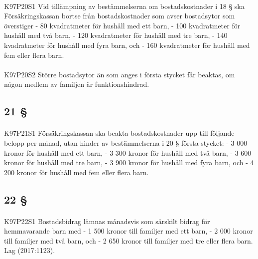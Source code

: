 \documentclass[a4paper,notitlepage,openany,10pt]{book}
\begin{document}
\paragraph*{}
{\tiny K97P20S1}
Vid tillämpning av bestämmelserna om bostadskostnader i 18 § ska Försäkringskassan bortse från bostadskostnader som avser bostadsytor som överstiger - 80 kvadratmeter för hushåll med ett barn,
\newline - 100 kvadratmeter för hushåll med två barn,
\newline - 120 kvadratmeter för hushåll med tre barn,
\newline - 140 kvadratmeter för hushåll med fyra barn, och
\newline - 160 kvadratmeter för hushåll med fem eller flera barn.
\paragraph*{}
{\tiny K97P20S2}
Större bostadsytor än som anges i första stycket får beaktas, om någon medlem av familjen är funktionshindrad.
\subsection*{21 §}
\paragraph*{}
{\tiny K97P21S1}
Försäkringskassan ska beakta bostadskostnader upp till följande belopp per månad, utan hinder av bestämmelserna i 20 § första stycket:
\newline - 3 000 kronor för hushåll med ett barn,
\newline - 3 300 kronor för hushåll med två barn,
\newline - 3 600 kronor för hushåll med tre barn,
\newline - 3 900 kronor för hushåll med fyra barn, och
\newline - 4 200 kronor för hushåll med fem eller flera barn.
\subsection*{22 §}
\paragraph*{}
{\tiny K97P22S1}
Bostadsbidrag lämnas månadsvis som särskilt bidrag för hemmavarande barn med
\newline - 1 500 kronor till familjer med ett barn,
\newline - 2 000 kronor till familjer med två barn, och
\newline - 2 650 kronor till familjer med tre eller flera barn.
Lag (2017:1123).
\end{document}
